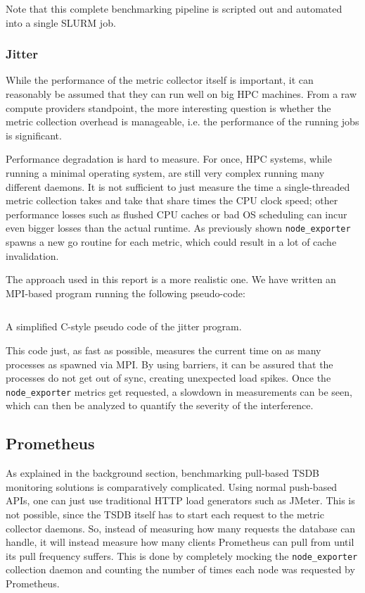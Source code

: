 Note that this complete benchmarking pipeline is scripted out and automated into a single SLURM job.
\subsubsection{Jitter}
While the performance of the metric collector itself is important, it can reasonably be assumed that they can run well on big \ac{HPC} machines. From a raw compute providers standpoint, the more interesting question is whether the metric collection overhead is manageable, i.e. the performance  of the running jobs is significant. 

Performance degradation is hard to measure. For once, \ac{HPC} systems, while running a minimal operating system, are still very complex running many different daemons. It is not sufficient to just measure the time a single-threaded metric collection takes and take that share times the CPU clock speed; other performance losses such as flushed CPU caches or bad OS scheduling can incur even bigger losses than the actual runtime. As previously shown \texttt{node\_exporter} spawns a new go routine for each metric, which could result in a lot of cache invalidation.

The approach used in this report is a more realistic one. We have written an MPI-based program running the following pseudo-code:
\begin{listing}[H]
  \inputminted{C}{./jitter.c}
  \caption{A simplified C-style pseudo code of the jitter program.}
\end{listing}
This code just, as fast as possible, measures the current time on as many processes as spawned via MPI. By using barriers, it can be assured that the processes do not get out of sync, creating unexpected load spikes. Once the \texttt{node\_exporter} metrics get requested, a slowdown in measurements can be seen, which can then be analyzed to quantify the severity of the interference.

\subsection{Prometheus}
As explained in the background section, benchmarking pull-based \ac{TSDB} monitoring solutions is comparatively complicated. Using normal push-based APIs, one can just use traditional HTTP load generators such as JMeter. This is not possible, since the \ac{TSDB} itself has to start each request to the metric collector daemons. So, instead of measuring how many requests the database can handle, it will instead measure how many clients Prometheus can pull from until its pull frequency suffers. This is done by completely mocking the \texttt{node\_exporter} collection daemon and counting the number of times each node was requested by Prometheus.

